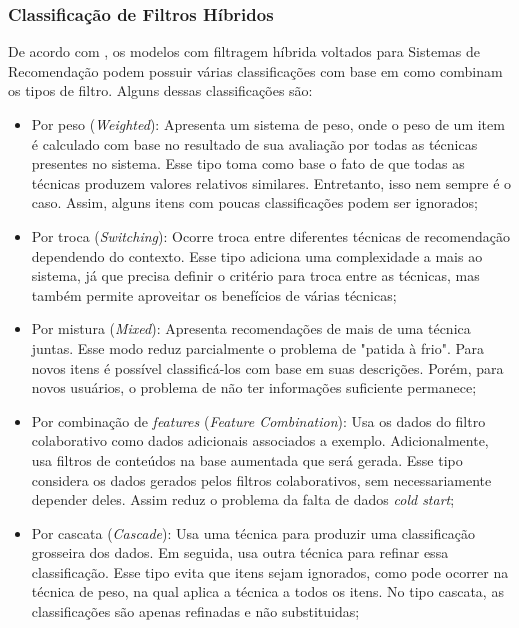 \subsubsection{Classificação de Filtros Híbridos}\label{subsubsec:tiposfh}
De acordo com , os modelos com filtragem híbrida voltados para Sistemas de Recomendação podem possuir
várias classificações com base em como combinam os tipos de filtro. Alguns dessas classificações são:

\begin{itemize}
    \item Por peso (\textit{Weighted}): Apresenta um sistema de peso, onde o peso de um item é calculado com base no resultado
    de sua avaliação por todas as técnicas presentes no sistema. Esse tipo toma como base o fato de que todas as técnicas 
    produzem valores relativos similares. Entretanto, isso nem sempre é o caso. Assim, alguns itens com poucas classificações 
    podem ser ignorados;

    \item Por troca (\textit{Switching}): Ocorre troca entre diferentes técnicas de recomendação dependendo do contexto.
    Esse tipo adiciona uma complexidade a mais ao sistema, já que precisa definir o critério para troca entre as técnicas,
    mas também permite aproveitar os benefícios de várias técnicas;

    \item Por mistura (\textit{Mixed}): Apresenta recomendações de mais de uma técnica juntas. Esse modo reduz parcialmente
    o problema de "patida à frio". Para novos itens é possível classificá-los com base em suas descrições. Porém, para novos 
    usuários, o problema de não ter informações suficiente permanece; 

    \item Por combinação de \textit{features} (\textit{Feature Combination}): Usa os dados do filtro colaborativo como dados
    adicionais associados a exemplo. Adicionalmente, usa filtros de conteúdos na base aumentada que será gerada. Esse tipo considera
    os dados gerados pelos filtros colaborativos, sem necessariamente depender deles. Assim reduz o problema da falta de dados
    \textit{cold start};

    \item Por cascata (\textit{Cascade}): Usa uma técnica para produzir uma classificação grosseira dos dados. Em seguida, 
    usa outra técnica para refinar essa classificação. Esse tipo evita que itens sejam ignorados, como pode ocorrer na técnica
    de peso, na qual aplica a técnica a todos os itens. No tipo cascata, as classificações são apenas refinadas e não substituidas; 


\end{itemize}
